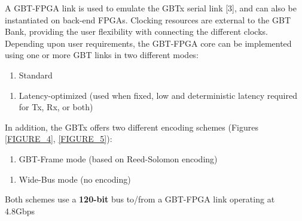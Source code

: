 A GBT-FPGA link is used to emulate the GBTx serial link [3], and can also be instantiated on back-end FPGAs. Clocking resources are external to the GBT Bank, providing the user flexibility with connecting the different clocks. Depending upon user requirements, the GBT-FPGA core can be implemented using one or more GBT links in two different modes:
\begin{enumerate}
\item Standard 
\end{enumerate}
\begin{enumerate}
\item Latency-optimized (used when fixed, low and deterministic latency required for Tx, Rx, or both)
\end{enumerate}
In addition, the GBTx offers two different encoding schemes (Figures \ref{FIGURE_4}, \ref{FIGURE_5}):
\begin{enumerate}
\item GBT-Frame mode (based on Reed-Solomon encoding)
\end{enumerate}
\begin{enumerate}
\item Wide-Bus mode (no encoding)
\end{enumerate}
Both schemes use a \textbf{120-bit} bus to/from a GBT-FPGA link operating at 4.8Gbps

